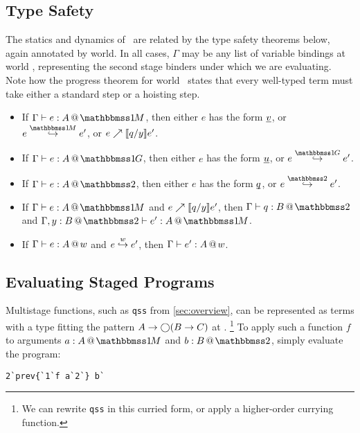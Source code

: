 \subsection{Type Safety}

The statics and dynamics of \lang\ are related by the type safety theorems below, again annotated by world.
In all cases, $\Gamma$ may be any list of variable bindings at world \bbtwo,
representing the second stage binders under which we are evaluating.
Note how the progress theorem for world \bbonem\ states that every well-typed term must take 
either a standard step or a hoisting step.

\begin{abstrsyn}
\begin{theorem} [Progress] \leavevmode
\label{thm:progress} 
\begin{itemize} 
\item If $\typesone e A$, then either $e$ has the form $\underline{\smash{v}}$, or $\stepmix e {e'}$, or ${e}\nearrow \llbracket q/y \rrbracket{e'}$.
\item If $\typespure e A$, then either $e$ has the form $\underline{\smash{u}}$, or $\steppure e {e'}$.
\item If $\typestwo e A$, then either $e$ has the form $\underline{\smash{q}}$, or $\steptwo e {e'}$.
\end{itemize}
\end{theorem}
\begin{theorem} [Preservation] \leavevmode
\label{thm:preservation} 
\begin{itemize} 
\item If $\typesone e A$ and ${e}\nearrow \llbracket q/y \rrbracket{e'}$, then $\typestwo q B$ and $\typesone [\Gamma,\coltwo y B] {e'} A$.
\item If $\Gamma{} \vdash {e}:{A}~\hspace{-0.15em}\text{@}\hspace{-0.2em}~w$ and ${e}\overset{w}\hookrightarrow {e'}$, then $\Gamma{} \vdash {e'}:{A}~\hspace{-0.15em}\text{@}\hspace{-0.2em}~w$.
\end{itemize}
\end{theorem}
\end{abstrsyn}


\subsection{Evaluating Staged Programs}

Multistage functions, such as \texttt{qss} from \ref{sec:overview},
can be represented as terms with a type fitting the pattern \mbox{$A\to \bigcirc (B \to C)$} at \bbonem.%
\footnote{We can rewrite \texttt{qss} in this curried form, or apply a
higher-order currying function.} 
To apply such a function $f$ to arguments $\colmix a A$ and $\coltwo b B$, simply
evaluate the program:
\begin{lstlisting}
2`prev{`1`f a`2`} b`
\end{lstlisting}

